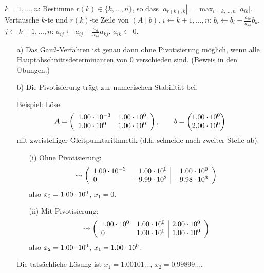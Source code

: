 \begin{Algorithmus}
\quad
\begin{codebox}
\li \For $k = 1, \ldots, n$:
\Do
  \li Bestimme $r(k) \in \{k, \ldots, n\}$, so dass
      $|a_{r(k),k}| = \max_{i=k,\ldots,n} |a_{ik}|.$
  \li Vertausche $k$-te und $r(k)$-te Zeile von $(A \mid b)$.
  \li \For $i \gets k + 1, \ldots, n$:
  \Do
    \li $b_i \gets b_i - \frac{a_{ik}}{a_{kk}} b_k$.
    \li \For $j \gets k+1, \ldots, n$:
    \Do
      \li $a_{ij} \gets a_{ij} - \frac{a_{ik}}{a_{kk}} a_{kj}$.
    \End
    \li $a_{ik} \gets 0$.
  \End
\End
\end{codebox}
\end{Algorithmus}

\begin{Bemerkungen}
\quad
\begin{itemize}
  \item[a)] Das Gauß-Verfahren ist genau dann ohne Pivotisierung möglich,
    wenn alle Hauptabschnittsdeterminanten von 0 verschieden sind. (Beweis in den Übungen.)

  \item[b)] Die Pivotisierung trägt zur numerischen Stabilität bei.

  Beispiel: Löse \[
    A = \left( \begin{array}{ll}
      1.00\cdot 10^{-3} & 1.00\cdot 10^{0} \\
      1.00\cdot 10^{0} &  1.00\cdot 10^{0}
    \end{array} \right),
    \qquad
    b = \begin{pmatrix}
      1.00\cdot 10^{0} \\
      2.00\cdot 10^{0}
    \end{pmatrix}
  \]
  mit zweistelliger Gleitpunktarithmetik (d.h. schneide nach zweiter Stelle ab).

  \begin{itemize}
    \item[(i)] Ohne Pivotisierung: \[
        \rightsquigarrow \left( \begin{array}{lr|r}
          1.00\cdot 10^{-3} & 1.00\cdot 10^{0} & 1.00\cdot 10^{0} \\
          0         & -9.99\cdot 10^{3} & -9.98\cdot 10^{3}
        \end{array} \right)
      \] also $x_2 = 1.00\cdot 10^{0}$, $x_1 = 0$.

    \item[(ii)] Mit Pivotisierung: \[
        \rightsquigarrow \left( \begin{array}{ll|l}
          1.00\cdot 10^{0} & 1.00\cdot 10^{0} & 2.00\cdot 10^{0} \\
          0         & 1.00\cdot 10^{0} & 1.00\cdot 10^{0}
        \end{array} \right)
      \] also $x_2 = 1.00\cdot 10^{0}$, $x_1 = 1.00\cdot 10^{0}$.
  \end{itemize}
  Die tatsächliche Lösung ist $x_1 = 1.00101\ldots$, $x_2 = 0.99899\ldots$.
\end{itemize}
\end{Bemerkungen}
